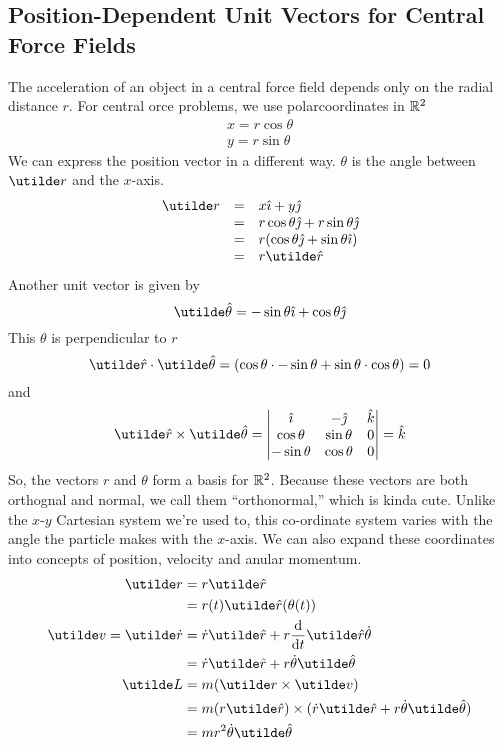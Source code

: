 \documentclass{report}
\begin{document}
\subsection*{Position-Dependent Unit Vectors for Central Force Fields}
The acceleration of an object in a central force field depends only on the radial distance $r$. For central orce problems, we use polarcoordinates in $\mathbb{R}^2$
$$
	\begin{array}{c}
		x = r\cos\theta \\ y = r\sin\theta
	\end{array}
$$
We can express the position vector in a different way. $\theta$ is the angle between $\ut{r}$ and the $x$-axis.
$$
	\begin{array}{rll}
		\ut{r} & = & x\ihat + y\jhat \\
			& = & r\cos\theta\jhat + r\sin\theta\jhat \\
			& = & r(\cos\theta\jhat + \sin\theta\ihat) \\
			& = & r\unit{r}
	\end{array}
$$
Another unit vector is given by
$$
	\unit{\theta} = -\sin\theta\ihat + \cos\theta\jhat
$$
This $\unit{\theta}$ is perpendicular to $\unit{r}$
$$
	\unit{r}\cd\unit{\theta} = (\cos\theta\cd-\sin\theta + \sin\theta\cd\cos\theta) = 0
$$
and
$$
	\unit{r}\times\unit{\theta} = \begin{vmatrix} \ihat & -\jhat & \khat \\ \cos\theta & \sin\theta & 0 \\ -\sin\theta & \cos\theta & 0 \end{vmatrix} = \khat
$$
So, the vectors $\unit{r}$ and $\unit{\theta}$ form a basis for $\mathbb{R}^2$. Because these vectors are both orthognal and normal, we call them ``orthonormal,'' which is kinda cute. Unlike the $x$-$y$ Cartesian system we're used to, this co-ordinate system varies with the angle the particle makes with the $x$-axis. We can also expand these coordinates into concepts of position, velocity and anular momentum.
\begin{align*}
	\ut{r} &= r\unit{r} \\
		&= r(t)\unit{r}(\theta(t)) \\
	\ut{v} = \ut{\dot{r}} &= \dot{r}\unit{r} + r\dd{t}\unit{r}\dot{\theta} \\
		&= \dot{r}\unit{r} + r\dot{\theta}\unit{\theta} \\
	\ut{L} &= m(\ut{r}\times\ut{v}) \\
		&= m(r\unit{r})\times(\dot{r}\unit{r}+r\dot{\theta}\unit{\theta}) \\
		&= mr^2\dot{\theta}\unit{\theta}
\end{align*}
\end{document}
